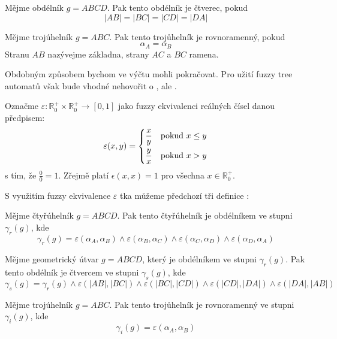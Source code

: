 \documentclass[a4paper,10pt]{article}
\begin{document}
\begin{definition}[Čtverec]
 Mějme obdélník $g = A B C D$. Pak tento obdélník je čtverec, pokud
 $$
  |A B| = |B C| = |C D| = |D A|
 $$
\end{definition}

\begin{definition}
  Mějme trojúhelník $g = A B C$. Pak tento trojůhelník je rovnoramenný, pokud
  $$
    \alpha_A = \alpha_B
  $$
  Stranu $AB$ nazývejme základna, strany $AC$ a $BC$ ramena.
\end{definition}

Obdobným způsobem bychom ve výčtu mohli pokračovat. Pro užití fuzzy tree automatů však bude vhodné nehovořit o , ale .

Označme $\varepsilon: \mathbb{R}_0^+ \times \mathbb{R}_0^+ \rightarrow [0,1]$ jako fuzzy ekvivalenci reálných čísel danou předpisem:
$$
  \varepsilon(x, y) =
    \begin{dcases}
     \frac{x}{y}	& \text{pokud $x \leq y$}	\\
     \frac{y}{x}	& \text{pokud $x > y$}
    \end{dcases}
$$
s tím, že $\frac{0}{0} = 1$. Zřejmě platí $\epsilon(x, x) = 1$ pro všechna $x \in \mathbb{R}_0^+$.

S využitím fuzzy ekvivalence $\varepsilon$ tka můžeme předchozí tři definice :

\begin{definition}
 Mějme čtyřúhelník $g = A B C D$. Pak tento čtyřúhelník je obdélníkem ve stupni $\gamma_r(g)$, kde
 $$
  \gamma_r(g) = \varepsilon(\alpha_A, \alpha_B) 
  \wedge \varepsilon(\alpha_B, \alpha_C)
  \wedge \varepsilon(\alpha_C, \alpha_D)
  \wedge \varepsilon(\alpha_D, \alpha_A)
 $$
\end{definition}

\begin{definition}
 Mějme geometrický útvar $g = A B C D$, který je obdélníkem ve stupni $\gamma_r(g)$. Pak tento obdélník je čtvercem ve stupni $\gamma_s(g)$, kde
 $$
 \gamma_s(g) = \gamma_r(g)
  \wedge \varepsilon(|A B|, |B C|) 
  \wedge \varepsilon(|B C|, |C D|)
  \wedge \varepsilon(|C D|, |D A|)
  \wedge \varepsilon(|D A|, |A B|)
 $$
\end{definition}

\begin{definition}
  Mějme trojúhelník $g = A B C$. Pak tento trojůhelník je rovnoramenný ve stupni $\gamma_i(g)$, kde
  $$
    \gamma_i(g) = \varepsilon(\alpha_A, \alpha_B)
  $$
\end{definition}
\end{document}
